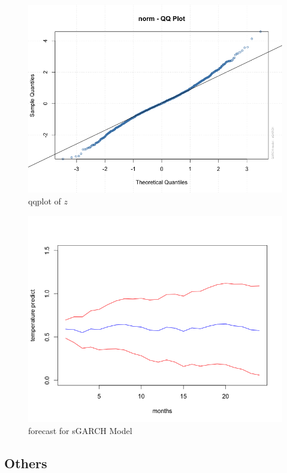 \documentclass[a4paper,10pt]{article}
\begin{document}
\begin{figure}[H]
\centering
\caption{qqplot of $z$}
\includegraphics[scale=.60]{qqplot.png}
\end{figure}

\begin{figure}[H]
\centering
\caption{forecast for sGARCH Model}
\includegraphics[scale=.60]{predict01.png}
\end{figure}

\subsection{Others}
\end{document}
